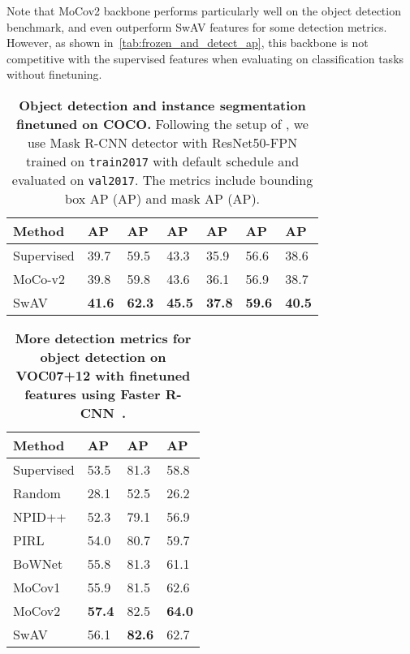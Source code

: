 \documentclass{article}
\def\OURS{SwAV\xspace}
\newcommand{\VOCseventwelve}{VOC07+12\xspace}
\begin{document}
Note that MoCov2 backbone performs particularly well on the object detection benchmark, and even outperform \OURS features for some detection metrics.
However, as shown in~\cref{tab:frozen_and_detect_ap}, this backbone is not competitive with the supervised features when evaluating on classification tasks without finetuning.

\begin{table}[h]
\centering
  \caption{
\textbf{Object detection and instance segmentation finetuned on COCO.}
Following the setup of \cite{he2019momentum}, we use Mask R-CNN detector with ResNet50-FPN trained on \texttt{train2017} with default  schedule and evaluated on \texttt{val2017}.
The metrics include bounding box AP (AP) and mask AP (AP).}
\vspace{.3em}
\begin{tabular}{l lll lll}
\toprule
	Method & AP & AP & AP & AP & AP & AP \\
\midrule
	Supervised  & 39.7 & 59.5 & 43.3 & 35.9 & 56.6 & 38.6 \\
\midrule
	MoCo-v2~\cite{chen2020improved} & 39.8 & 59.8 & 43.6 & 36.1 & 56.9 & 38.7 \\
\midrule
	\OURS  & \bf 41.6 & \bf 62.3 & \bf 45.5 & \bf 37.8 & \bf 59.6 & \bf 40.5 \\
\bottomrule
\end{tabular}
  \label{tab:cocomask}
\end{table}

\begin{table}[h]
\centering
  \caption{
\textbf{More detection metrics for object detection on \VOCseventwelve with finetuned features using Faster R-CNN~\cite{ren2015faster}.}
}
\vspace{.3em}
\begin{tabular}{l lll}
\toprule
Method & AP & AP & AP \\
\midrule
Supervised                                   & 53.5 & 81.3 & 58.8 \\
Random                                            & 28.1 & 52.5 & 26.2 \\
\midrule
NPID++~\cite{misra2019self} & 52.3 & 79.1 & 56.9 \\
PIRL~\cite{misra2019self} & 54.0 & 80.7 & 59.7 \\
BoWNet~\cite{gidaris2020learning} & 55.8 & 81.3 & 61.1 \\
MoCov1~\cite{he2019momentum} & 55.9 & 81.5 & 62.6 \\
MoCov2~\cite{chen2020improved} & \bf 57.4 & 82.5 & \bf 64.0 \\
\midrule
\OURS  & 56.1 & \bf 82.6 & 62.7 \\
\bottomrule
\end{tabular}
  \label{tab:voc}
\end{table}
\end{document}
